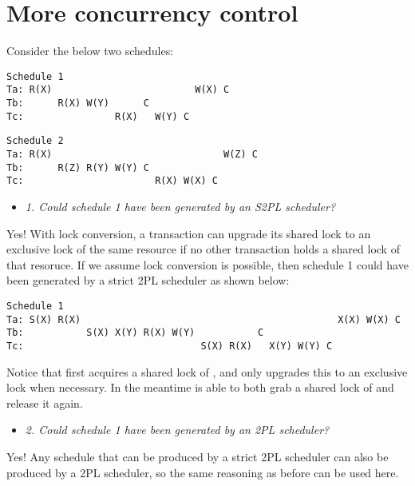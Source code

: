 \newpage
\section{More concurrency control}

Consider the below two schedules:

\begin{verbatim}
Schedule 1
Ta: R(X)                         W(X) C
Tb:      R(X) W(Y)      C
Tc:                R(X)   W(Y) C
\end{verbatim}

\begin{verbatim}
Schedule 2
Ta: R(X)                              W(Z) C
Tb:      R(Z) R(Y) W(Y) C
Tc:                       R(X) W(X) C
\end{verbatim}

\begin{itemize}
  \item \textit{1. Could schedule 1 have been generated by an S2PL scheduler?}
\end{itemize}

Yes! With lock conversion, a transaction can upgrade its shared lock to an
exclusive lock of the same resource if no other transaction holds a shared lock
of that resoruce. If we assume lock conversion is possible, then schedule 1
could have been generated by a strict 2PL scheduler as shown below:

\begin{verbatim}
Schedule 1
Ta: S(X) R(X)                                             X(X) W(X) C
Tb:           S(X) X(Y) R(X) W(Y)           C
Tc:                               S(X) R(X)   X(Y) W(Y) C
\end{verbatim}

Notice that  first acquires a shared lock of , and only upgrades
this to an exclusive lock when necessary. In the meantime  is able to
both grab a shared lock of  and release it again.

\streg

\begin{itemize}
  \item \textit{2. Could schedule 1 have been generated by an 2PL scheduler?}
\end{itemize}

Yes! Any schedule that can be produced by a strict 2PL scheduler can also be
produced by a 2PL scheduler, so the same reasoning as before can be used here.

\streg

